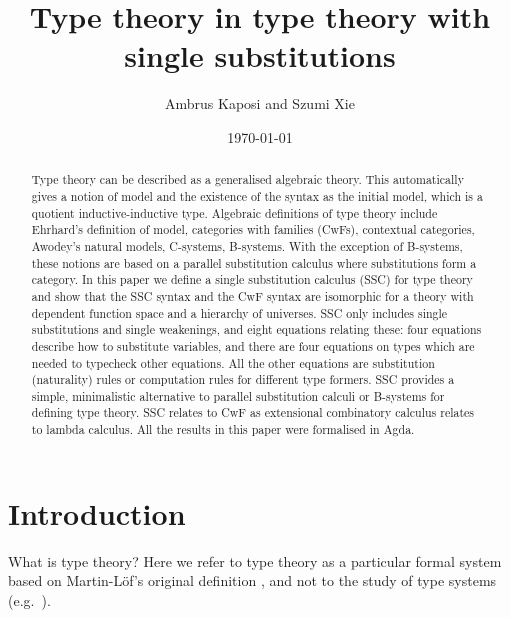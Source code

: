 \documentclass[sigplan,10pt,anonymous,review]{acmart}\settopmatter{printfolios=true,printccs=false,printacmref=false}
\begin{document}
\newtheorem{problem}[theorem]{Problem}
\theoremstyle{remark}
\newtheorem{construction}[theorem]{Construction}

\title{Type theory in type theory with single substitutions}
\author{Ambrus Kaposi and Szumi Xie}
\date{\today}

\begin{abstract}
Type theory can be described as a generalised algebraic theory. This
automatically gives a notion of model and the existence of the syntax
as the initial model, which is a quotient inductive-inductive
type. Algebraic definitions of type theory include Ehrhard's
definition of model, categories with families (CwFs), contextual
categories, Awodey's natural models, C-systems, B-systems. With the
exception of B-systems, these notions are based on a parallel
substitution calculus where substitutions form a category. In this
paper we define a single substitution calculus (SSC) for type theory
and show that the SSC syntax and the CwF syntax are isomorphic for a
theory with dependent function space and a hierarchy of universes. SSC
only includes single substitutions and single weakenings, and eight
equations relating these: four equations describe how to substitute
variables, and there are four equations on types which are needed to
typecheck other equations. All the other equations are substitution
(naturality) rules or computation rules for different type
formers. SSC provides a simple, minimalistic alternative to parallel
substitution calculi or B-systems for defining type theory. SSC
relates to CwF as extensional combinatory calculus relates to lambda
calculus. All the results in this paper were formalised in Agda.
\end{abstract}

\maketitle

\section{Introduction}

What is type theory? Here we refer to type theory as a particular
formal system based on Martin-Löf's original definition
\cite{martinlof73predicative}, and not to the study of type systems
(e.g.\ \cite{DBLP:books/daglib/0005958}).
\end{document}
